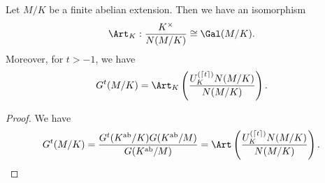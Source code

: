 \documentclass[a4paper]{article}
\begin{document}
\begin{cor}
  Let $M/K$ be a finite abelian extension. Then we have an isomorphism
  \[
    \Art_K: \frac{K^\times}{N(M/K)} \cong \Gal(M/K).
  \]
  Moreover, for $t > -1$, we have
  \[
    G^t(M/K) = \Art_K\left(\frac{U_K^{(\lceil t\rceil)}N(M/K)}{N(M/K)}\right).
  \]
\end{cor}

\begin{proof}
  We have
  \[
    G^t(M/K) = \frac{G^t(K^{\mathrm{ab}}/K) G(K^{\mathrm{ab}}/M)}{G(K^{\mathrm{ab}}/M)} = \Art\left(\frac{U_K^{(\lceil t\rceil)}N(M/K)}{N(M/K)}\right).
  \]
\end{proof} %


\printindex
\end{document}
